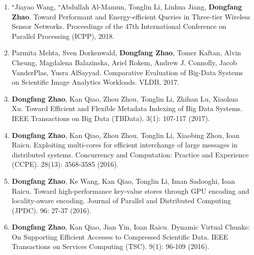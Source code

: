 \documentclass[11pt,]{scrartcl}
\begin{document}
\begin{enumerate}
\item 	$^\star$Jiayao Wang, $^\star$Abdullah Al-Mamun, Tonglin Li, Linhua Jiang, \textbf{Dongfang Zhao}.
Toward Performant and Energy-efficient Queries in Three-tier Wireless Sensor Networks. Proceedings of the 47th International Conference on Parallel Processing (ICPP), 2018.


\item Parmita Mehta, Sven Dorkenwald, \textbf{Dongfang Zhao}, Tomer Kaftan, Alvin Cheung, Magdalena Balazinska, Ariel Rokem, Andrew J. Connolly, Jacob VanderPlas, Yusra AlSayyad.
Comparative Evaluation of Big-Data Systems on Scientific Image Analytics Workloads. 
VLDB, 2017.

\item \textbf{Dongfang Zhao}, Kan Qiao, Zhou Zhou, Tonglin Li, Zhihan Lu, Xiaohua Xu.
Toward Efficient and Flexible Metadata Indexing of Big Data Systems. IEEE Transactions on Big Data (TBData). 3(1): 107-117 (2017).


\item \textbf{Dongfang Zhao}, Kan Qiao, Zhou Zhou, Tonglin Li, Xiaobing Zhou, Ioan Raicu.
Exploiting multi-cores for efficient interchange of large messages in distributed systems. Concurrency and Computation: Practice and Experience (CCPE). 28(13): 3568-3585 (2016).

\item \textbf{Dongfang Zhao}, Ke Wang, Kan Qiao, Tonglin Li, Iman Sadooghi, Ioan Raicu.
Toward high-performance key-value stores through GPU encoding and locality-aware encoding. Journal of Parallel and Distributed Computing (JPDC). 96: 27-37 (2016).


\item \textbf{Dongfang Zhao}, Kan Qiao, Jian Yin, Ioan Raicu.
Dynamic Virtual Chunks: On Supporting Efficient Accesses to Compressed Scientific Data. IEEE Transactions on Services Computing (TSC). 9(1): 96-109 (2016).


\end{enumerate}
\end{document}
